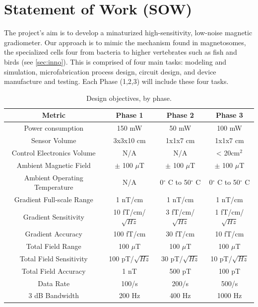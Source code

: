 
\section{Statement of Work (SOW)}
The project's aim is to develop a minaturized high-sensitivity, low-noise magnetic gradiometer. Our approach is to mimic the mechanism found in magnetosomes, the specialized cells four from bacteria to higher vertebrates such as fish and birds (see \ref{sec:inno}). This is comprised of four main tasks: modeling and simulation, microfabrication process design, circuit design, and device manufacture and testing. Each Phase (1,2,3) will include these four tasks.
\begin{table}[h!]
\centering
  \begin{tabular}{|c||c|c|c|}
    \hline
    Metric & Phase 1 & Phase 2 & Phase 3 \\
    \hline
    \hline
    Power consumption & 150 mW & 50 mW & 100 mW \\
    \hline
    Sensor Volume & 3x3x10 cm & 1x1x7 cm & 1x1x7 cm \\
    \hline
    Control Electronics Volume  & N/A & N/A & < 20cm$^2$ \\
    \hline
    Ambient Magnetic Field & $\pm$ 100 $\mu$T & $\pm$ 100 $\mu$T & $\pm$ 100 $\mu$T \\
    \hline
    Ambient Operating Temperature & N/A & 0$^{\circ}$ C to 50$^{\circ}$ C & 0$^{\circ}$ C to 50$^{\circ}$ C \\
    \hline
    Gradient Full-scale Range & 1 nT/cm & 1 nT/cm & 1 nT/cm \\
    \hline
    Gradient Sensitivity & 10 fT/cm/$\sqrt{Hz}$ & 3 fT/cm/$\sqrt{Hz}$  & 1 fT/cm/$\sqrt{Hz}$ \\
    \hline
    Gradient Accuracy & 100 fT/cm & 30 fT/cm & 10 fT/cm \\
    \hline
    Total Field Range & 100 $\mu$T & 100 $\mu$T & 100 $\mu$T \\
    \hline
    Total Field Sensitivity & 100 pT/$\sqrt{Hz}$ & 30 pT/$\sqrt{Hz}$  &  10 pT/$\sqrt{Hz}$ \\
    \hline
    Total Field Accuracy & 1 nT & 500 pT & 100 pT \\
    \hline
    Data Rate & 100/s & 200/s & 500/s \\
    \hline
    3 dB Bandwidth & 200 Hz & 400 Hz & 1000 Hz\\
    \hline
  \end{tabular}
\caption{Design objectives, by phase.}
\label{table:obj}
\end{table}

